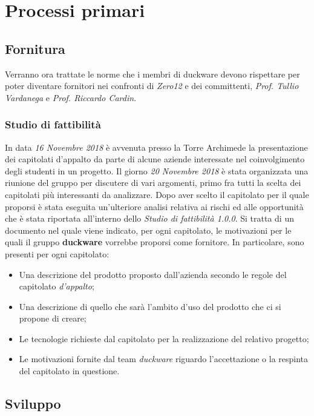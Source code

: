 \section{Processi primari}
\subsection{Fornitura}
Verranno ora trattate le norme che i membri di duckware devono rispettare per poter diventare fornitori nei confronti di \emph{Zero12} e dei committenti, \emph{Prof. Tullio Vardanega} e \emph{Prof. Riccardo Cardin}.
\subsubsection{Studio di fattibilità}
In data \emph{16 Novembre 2018} è avvenuta presso la Torre Archimede la presentazione dei capitolati d’appalto da parte di alcune aziende interessate nel coinvolgimento degli studenti in un progetto. Il giorno \emph{20 Novembre 2018} è stata organizzata una riunione del gruppo per discutere di vari argomenti, primo fra tutti la scelta dei capitolati più interessanti da analizzare.
Dopo aver scelto il capitolato per il quale proporsi è stata eseguita un’ulteriore analisi relativa ai rischi ed alle opportunità che è stata riportata all’interno dello \emph{Studio di fattibilità 1.0.0}. Si tratta di un documento nel quale viene indicato, per ogni capitolato, le motivazioni per le quali il gruppo \textbf{duckware} vorrebbe proporsi come fornitore. In particolare, sono presenti per ogni capitolato:
\begin{itemize}
	\item Una descrizione del prodotto proposto dall’azienda secondo le regole del capitolato \emph{d’appalto};
	\item Una descrizione di quello che sarà l’ambito d’uso del prodotto che ci si propone di creare;
	\item Le tecnologie richieste dal capitolato per la realizzazione del relativo progetto;
	\item Le motivazioni fornite dal team \emph{duckware} riguardo l’accettazione o la respinta del capitolato in questione.
\end{itemize}
\subsection{Sviluppo}
